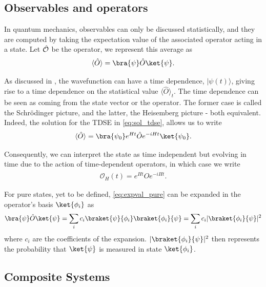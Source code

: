 \subsection{Observables and operators}
In quantum mechanics, observables can only be discussed statistically, and they are computed by taking the expectation value of the associated operator acting in a state. Let $\hat{\mathcal{O}}$ be the operator, we represent this average as
\begin{equation}
   \langle \hat{O} \rangle = \bra{\psi} \hat{O} \ket{\psi}.
   \label{eq:expval_pure}
\end{equation}

As discussed in , the wavefunction can have a time dependence, $ | \psi(t) \rangle $, giving rise to a time dependence on the statistical value $\langle \hat{O} \rangle_t$. The time dependence can be seen as coming from the state vector or the operator. The former case is called the Schrödinger picture, and the latter, the Heisemberg picture - both equivalent. Indeed, the solution for the TDSE in \eqref{eq:sol_tdse}, allows us to write
\begin{align*}
     \langle \hat{O} \rangle  = \bra{\psi_0}e^{Ht} \hat{O} e^{-iHt}\ket{\psi_0}.
\end{align*}

Consequently, we can interpret the state as time independent but evolving in time due to the action of time-dependent operators, in which case we write
\begin{align*}
    \mathcal{O}_H(t) = e^{Ht} \hat{O} e^{-iHt}.
\end{align*}

For pure states, yet to be defined, \eqref{eq:expval_pure} can be expanded in the operator's basis $\ket{\phi_i}$ as
\begin{equation*}
    \bra{\psi} \hat{O} \ket{\psi} = \sum_i c_i \braket{\psi}{\phi_i} \braket{\phi_i}{\psi} =  \sum_i c_i  \vert \braket{\phi_i}{\psi}\vert^2
\end{equation*}
where $c_i$ are the coefficients of the expansion. $\vert \braket{\phi_i}{\psi}\vert^2$ then represents the probability that $\ket{\psi}$ is measured in state $\ket{\phi_i}$.

\subsection{Composite Systems}

